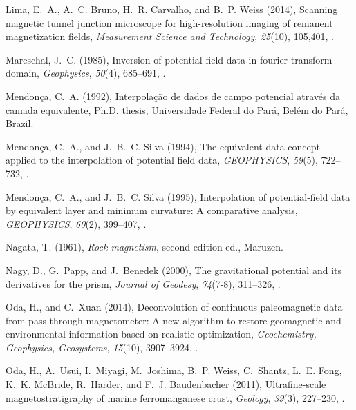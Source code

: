 \documentclass[draft,gc]{agutex}
\begin{document}
\begin{article}
\begin{thebibliography}{56}
Lima, E.~A., A.~C. Bruno, H.~R. Carvalho, and B.~P. Weiss (2014), Scanning
  magnetic tunnel junction microscope for high-resolution imaging of remanent
  magnetization fields, \textit{Measurement Science and Technology},
  \textit{25}(10), 105,401, .

Mareschal, J.~C. (1985), Inversion of potential field data in fourier transform
  domain, \textit{Geophysics}, \textit{50}(4), 685--691,
  .

Mendon\c{c}a, C.~A. (1992), Interpola\c{c}\~{a}o de dados de campo potencial
  atrav\'{e}s da camada equivalente, Ph.D. thesis, Universidade Federal do
  Par\'{a}, Bel\'{e}m do Par\'{a}, Brazil.

Mendon\c{c}a, C.~A., and J.~B.~C. Silva (1994), The equivalent data concept
  applied to the interpolation of potential field data, \textit{GEOPHYSICS},
  \textit{59}(5), 722--732, .

Mendon\c{c}a, C.~A., and J.~B.~C. Silva (1995), Interpolation of
  potential‐field data by equivalent layer and minimum curvature: A
  comparative analysis, \textit{GEOPHYSICS}, \textit{60}(2), 399--407,
  .

Nagata, T. (1961), \textit{Rock magnetism}, second edition ed., Maruzen.

Nagy, D., G.~Papp, and J.~Benedek (2000), The gravitational potential and its
  derivatives for the prism, \textit{Journal of Geodesy}, \textit{74}(7-8),
  311--326, .

Oda, H., and C.~Xuan (2014), Deconvolution of continuous paleomagnetic data
  from pass-through magnetometer: A new algorithm to restore geomagnetic and
  environmental information based on realistic optimization,
  \textit{Geochemistry, Geophysics, Geosystems}, \textit{15}(10), 3907--3924,
  .

Oda, H., A.~Usui, I.~Miyagi, M.~Joshima, B.~P. Weiss, C.~Shantz, L.~E. Fong,
  K.~K. McBride, R.~Harder, and F.~J. Baudenbacher (2011), Ultrafine-scale
  magnetostratigraphy of marine ferromanganese crust, \textit{Geology},
  \textit{39}(3), 227--230, .


\end{thebibliography}
\end{article}
\end{document}
